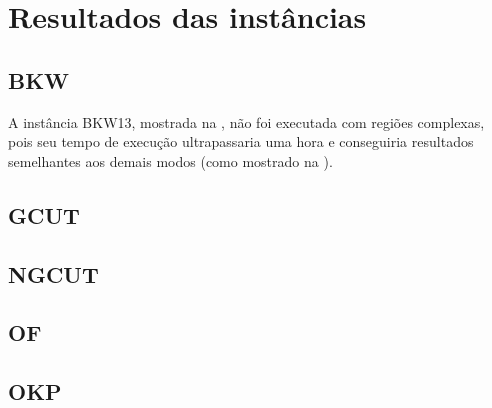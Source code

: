 \chapter{Resultados das instâncias}\label{ch:resultados-das-instancias}


\section{BKW}\label{sec:bkw}
%














A instância BKW13, mostrada na , não foi executada com regiões complexas, pois seu
tempo de execução ultrapassaria uma hora e conseguiria resultados semelhantes aos demais modos
(como mostrado na ).



\section{GCUT}\label{sec:gcut}















\section{NGCUT}\label{sec:ngcut}














\section{OF}\label{sec:of}




\section{OKP}\label{sec:okp}





